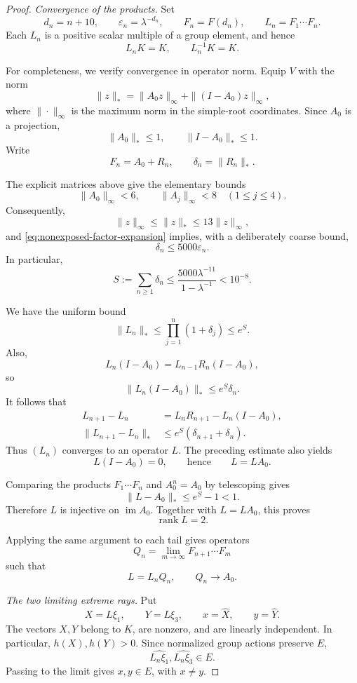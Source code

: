 \documentclass[11pt,reqno]{amsart}
\theoremstyle{plain}
\theoremstyle{definition}
\theoremstyle{remark}
\numberwithin{equation}{section}
\begin{document}
\begin{proof}
\medskip
\noindent\textit{Convergence of the products.}
Set
\[
d_n=n+10,
\qquad
\varepsilon_n=\lambda^{-d_n},
\qquad
F_n=F(d_n),
\qquad
L_n=F_1\cdots F_n.
\]
Each $L_n$ is a positive scalar multiple of a group element,
and hence
\[
L_nK=K,
\qquad
L_n^{-1}K=K.
\]

For completeness, we verify convergence in operator norm.
Equip $V$ with the norm
\[
\|z\|_*=
\|A_0z\|_\infty+\|(I-A_0)z\|_\infty,
\]
where $\|\cdot\|_\infty$ is the maximum norm in the simple-root
coordinates. Since $A_0$ is a projection,
\[
\|A_0\|_*\le1,
\qquad
\|I-A_0\|_*\le1.
\]
Write
\[
F_n=A_0+R_n,
\qquad
\delta_n=\|R_n\|_*.
\]

The explicit matrices above give the elementary bounds
\[
\|A_0\|_\infty<6,
\qquad
\|A_j\|_\infty<8
\quad(1\le j\le4).
\]
Consequently,
\[
\|z\|_\infty\le\|z\|_*\le13\|z\|_\infty,
\]
and \eqref{eq:nonexposed-factor-expansion} implies, with a
deliberately coarse bound,
\[
\delta_n\le5000\varepsilon_n.
\]
In particular,
\begin{equation}\label{eq:nonexposed-small-perturbation}
S:=\sum_{n\ge1}\delta_n
\le
\frac{5000\lambda^{-11}}{1-\lambda^{-1}}
<10^{-8}.
\end{equation}

We have the uniform bound
\[
\|L_n\|_*
\le
\prod_{j=1}^{n}(1+\delta_j)
\le e^S.
\]
Also,
\[
L_n(I-A_0)=L_{n-1}R_n(I-A_0),
\]
so
\[
\|L_n(I-A_0)\|_*\le e^S\delta_n.
\]
It follows that
\[
\begin{aligned}
L_{n+1}-L_n
&=L_nR_{n+1}-L_n(I-A_0),\\
\|L_{n+1}-L_n\|_*
&\le e^S(\delta_{n+1}+\delta_n).
\end{aligned}
\]
Thus $(L_n)$ converges to an operator $L$.
The preceding estimate also yields
\[
L(I-A_0)=0,
\qquad\text{hence}\qquad
L=LA_0.
\]

Comparing the products $F_1\cdots F_n$ and $A_0^n=A_0$
by telescoping gives
\[
\|L-A_0\|_*\le e^S-1<1.
\]
Therefore $L$ is injective on $\operatorname{im}A_0$.
Together with $L=LA_0$, this proves
\[
\operatorname{rank}L=2.
\]

Applying the same argument to each tail gives operators
\[
Q_n=\lim_{m\to\infty}F_{n+1}\cdots F_m
\]
such that
\begin{equation}\label{eq:nonexposed-tail}
L=L_nQ_n,
\qquad
Q_n\longrightarrow A_0.
\end{equation}

\medskip
\noindent\textit{The two limiting extreme rays.}
Put
\[
X=L\xi_1,
\qquad
Y=L\xi_3,
\qquad
x=\widehat X,
\qquad
y=\widehat Y.
\]
The vectors $X,Y$ belong to $K$, are nonzero, and are linearly
independent. In particular, $h(X),h(Y)>0$.
Since normalized group actions preserve $E$,
\[
\widehat{L_n\xi_1},\widehat{L_n\xi_3}\in E.
\]
Passing to the limit gives $x,y\in E$, with $x\ne y$.


\end{proof}
\end{document}
